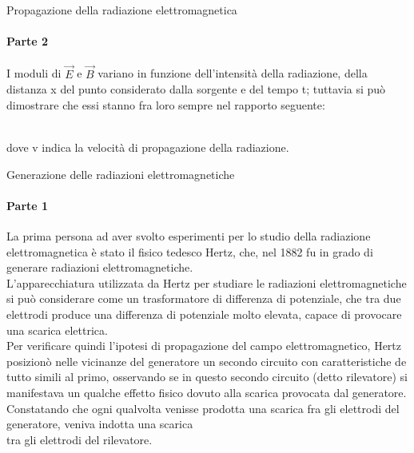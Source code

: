 \documentclass[aspectratio=169]{beamer}
\newcommand*{\vet}{\fontfamily{qzc}\selectfont}
\begin{document}
\begin{frame}{Propagazione della radiazione elettromagnetica}
	\framesubtitle{Parte 2}
	I moduli di $\vec{E}$ e $\vec{B}$ variano in funzione dell'intensità della radiazione, della distanza {\vet x} del punto considerato dalla sorgente e del tempo {\vet t}; tuttavia si può dimostrare che essi stanno fra loro sempre nel rapporto seguente:\\
	\medskip
	\centering{{\textcolor{red!80}{{\vet v} = $\frac{E}{B}$}}}\\
	\medskip
	\raggedright{dove {\vet v} indica la velocità di propagazione della radiazione.}\\
\end{frame}

\begin{frame}{Generazione delle radiazioni elettromagnetiche}
	\framesubtitle{Parte 1}
	La prima persona ad aver svolto esperimenti per lo studio della radiazione elettromagnetica è stato il fisico tedesco Hertz, che, nel 1882 fu in grado di generare radiazioni elettromagnetiche.\\
	L'apparecchiatura utilizzata da Hertz per studiare le radiazioni elettromagnetiche si può considerare come un trasformatore di differenza di potenziale, che tra due elettrodi produce una differenza di potenziale molto elevata, capace di provocare una scarica elettrica.\\ 
	\medskip
	Per verificare quindi l'ipotesi di propagazione del campo elettromagnetico, Hertz posizionò nelle vicinanze del generatore un secondo circuito con caratteristiche de tutto simili al primo, osservando se in questo secondo circuito (detto rilevatore) si manifestava un qualche effetto fisico dovuto alla scarica provocata dal generatore. Constatando che ogni qualvolta venisse prodotta una scarica fra gli elettrodi del generatore, veniva indotta una scarica\\ tra gli elettrodi del rilevatore.\\
\end{frame}
\end{document}
